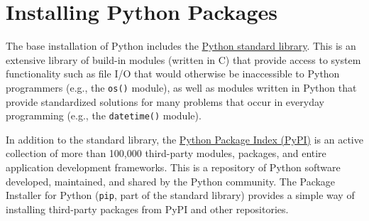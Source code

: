 \documentclass{UNB-Physics-Assignment}
\begin{document}
\section*{Installing Python Packages}

\noindent
The base installation of Python includes the \href{https://docs.python.org/3.12/library/index.html}{Python standard library}. This is an extensive library of build-in modules (written in C) that provide access to system functionality such as file I/O that would otherwise be inaccessible to Python programmers (e.g., the \verb"os()" module), as well as modules written in Python that provide standardized solutions for many problems that occur in everyday programming (e.g., the \verb"datetime()" module).

In addition to the standard library, the \href{https://pypi.org/}{Python Package Index (PyPI)} is an active collection of more than 100,000 third-party modules, packages, and entire application development frameworks. This is a repository of Python software developed, maintained, and shared by the Python community. The Package Installer for Python (\verb"pip", part of the standard library) provides a simple way of installing third-party packages from PyPI and other repositories.
\end{document}
